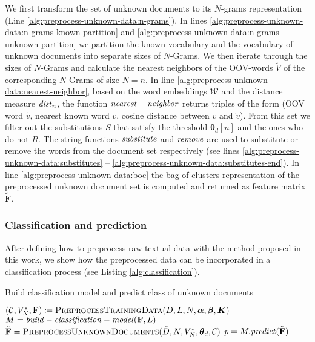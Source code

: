 We first transform the set of unknown documents to its $N$-grams representation
(Line \ref{alg:preprocess-unknown-data:n-grams}). In lines
\ref{alg:preprocess-unknown-data:n-grams-known-partition} and 
\ref{alg:preprocess-unknown-data:n-grams-unknown-partition} we partition the known
vocabulary and the vocabulary of unknown documents into separate sizes of $N$-Grams.
 We then iterate through the
sizes of $N$-Grams and calculate the nearest neighbors of the OOV-words
$\tilde{V}$ of the corresponding $N$-Grams of size $N=n$. In line
\ref{alg:preprocess-unknown-data:nearest-neighbor}, based on the word embeddings
$\mathcal{W}$ and the distance measure $\mathit{dist}_n$, the function $\mathit{nearest-neighbor}$ returns triples 
of the form (OOV word $\tilde{v}$, nearest known word $v$, cosine distance
between $v$ and $\tilde{v}$). 
From this set we filter out the substitutions $S$ that satisfy the
threshold $\boldsymbol \theta_d[n]$ and the ones who do not $R$. The
string functions $\mathit{substitute}$ and $\mathit{remove}$ are used to substitute or
remove the words from the document set respectively (see lines
\ref{alg:preprocess-unknown-data:substitutes} --
\ref{alg:preprocess-unknown-data:substitutes-end}). In line
\ref{alg:preprocess-unknown-data:boc} the bag-of-clusters
representation of the preprocessed unknown document set is computed and returned
as feature matrix $\mathbf{\tilde{F}}$.

\subsubsection{Classification and prediction}

After defining how to preprocess raw textual data with the method proposed in
this work, we show how the preprocessed data can be incorporated in a 
classification process (see Listing \ref{alg:classification}).

\begin{algorithm}
\label{alg:classification}
\caption{Build classification model and predict class of unknown documents}

\begin{algorithmic}[1]

\State $(\mathcal{C}, V_N^*, \mathbf{F}) \coloneqq
\textproc{PreprocessTrainingData}(D,L,N,\boldsymbol \alpha, \boldsymbol \beta, \boldsymbol K)$ \State $M = \mathit{build-classification-model}(\mathbf{F},L)$
\State $\mathbf{\tilde{F}} = \textproc{PreprocessUnknownDocuments}(\tilde{D}, N,
V_N^*, \boldsymbol\theta_d, \mathcal{C})$
\State $p = M.\mathit{predict}(\mathbf{\tilde{F}})$
\EndWhile

\EndFunction
\end{algorithmic}
\end{algorithm}

